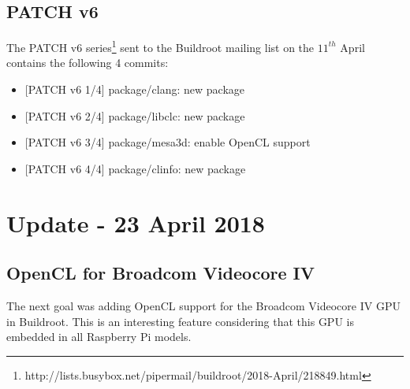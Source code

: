\documentclass[12pt,a4paper,oneside]{article}
\begin{document}
\subsection*{PATCH v6}
The PATCH v6 series\footnote{http://lists.busybox.net/pipermail/buildroot/2018-April/218849.html}
sent to the Buildroot mailing list on the $11^{th}$ April contains the following
4 commits:
\begin{itemize}
  \item {[PATCH v6 1/4]} package/clang: new package
  \item {[PATCH v6 2/4]} package/libclc: new package
  \item {[PATCH v6 3/4]} package/mesa3d: enable OpenCL support
  \item {[PATCH v6 4/4]} package/clinfo: new package
\end{itemize}

\newpage
\section*{Update - 23 April 2018}
\subsection*{OpenCL for Broadcom Videocore IV}
The next goal was adding OpenCL support for the Broadcom Videocore IV GPU in
Buildroot. This is an interesting feature considering that this GPU is embedded
in all Raspberry Pi models.
\end{document}
